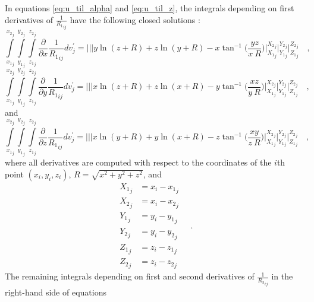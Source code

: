 \documentclass[journal abbreviation, manuscript]{copernicus}
\begin{document}
In equations  \ref{eq:u_til_alpha} and \ref{eq:u_til_z}, the integrals depending on 
first derivatives of ${\frac{1}{{R_1}_{ij}}}$ have the following closed solutions 
\citep{Nagyetal2000, Nagyetal2002}:
\begin{equation}
\int\limits_{{x_{1}}_{j}}^{{x_{2}}_{j}} \int\limits_{{y_{1}}_{j}}^{{y_{2}}_{j}} \int\limits_{{z_{1}}_{j}}^{{z_{2}}_{j}}
\frac{\partial }{\partial x} {\frac{1}{{R_1}_{ij}}} dv_{j}^{\prime} =
\Bigg|\Bigg|\Bigg| 
y \ln(z + R) + z \ln(y + R) -  x  \tan^{-1} \Bigg( \frac{yz}{x \: R} \Bigg) 
\Bigg|_{{X_1}_{j}}^{{X_2}_{j}} \Bigg|_{{Y_1}_{j}}^{{Y_2}_{j}} \Bigg|_{{Z_1}_{j}}^{{Z_2}_{j}} \quad ,
\label{dx1}
\end{equation}
\begin{equation}
\int\limits_{{x_{1}}_{j}}^{{x_{2}}_{j}} \int\limits_{{y_{1}}_{j}}^{{y_{2}}_{j}} \int\limits_{{z_{1}}_{j}}^{{z_{2}}_{j}}
\frac{\partial }{\partial y} {\frac{1}{{R_1}_{ij}}} dv_{j}^{\prime} =
\Bigg|\Bigg|\Bigg|
x \ln(z + R) + z \ln(x + R) -  y  \tan^{-1} \Bigg( \frac{xz}{y \: R} 
\Bigg)
\Bigg|_{{X_1}_{j}}^{{X_2}_{j}} \Bigg|_{{Y_1}_{j}}^{{Y_2}_{j}} \Bigg|_{{Z_1}_{j}}^{{Z_2}_{j}} \quad ,
\label{dy1}
\end{equation}
and
\begin{equation}
\int\limits_{{x_{1}}_{j}}^{{x_{2}}_{j}} \int\limits_{{y_{1}}_{j}}^{{y_{2}}_{j}} \int\limits_{{z_{1}}_{j}}^{{z_{2}}_{j}}
\frac{\partial }{\partial z} {\frac{1}{{R_1}_{ij}}} dv_{j}^{\prime} =
\Bigg|\Bigg|\Bigg|
x \ln(y + R) + y \ln(x + R) -  z  \tan^{-1} \Bigg( \frac{xy}{z \: R} \Bigg) 
\Bigg|_{{X_1}_{j}}^{{X_2}_{j}} \Bigg|_{{Y_1}_{j}}^{{Y_2}_{j}} \Bigg|_{{Z_1}_{j}}^{{Z_2}_{j}} \quad ,
\label{dz1}
\end{equation}
where all derivatives are computed with respect to the coordinates of the $i$th point 
$(x_i, y_i, z_i)$, $R = \sqrt{x^{2} + y^{2} + z^{2}}$, and
\begin{equation}
\begin{array}{ll}
{X_1}_{j} &= x_i - {x_1}_{j} \\
{X_2}_{j} &= x_i - {x_2}_{j} \\
{Y_1}_{j} &= y_i - {y_1}_{j} \\
{Y_2}_{j} &= y_i - {y_2}_{j} \\
{Z_1}_{j} &= z_i - {z_1}_{j} \\
{Z_2}_{j} &= z_i - {z_2}_{j}
\end{array} \quad .
\label{eq:Nagy_limits_1}
\end{equation}
The remaining integrals depending on first and second derivatives 
of ${\frac{1}{{R_2}_{ij}}}$ in the right-hand side of equations 
\end{document}
